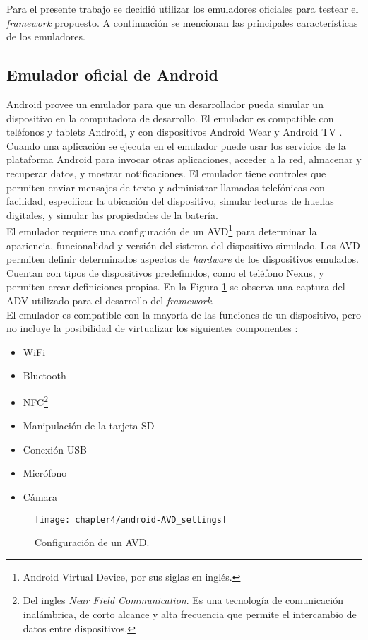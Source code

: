 Para el presente trabajo se decidió utilizar los emuladores oficiales para testear el \emph{framework} propuesto. A continuación se mencionan las principales características de los emuladores.
\subsection{Emulador oficial de Android}\label{ch05:andoid-emulator}
Android provee un emulador para que un desarrollador pueda simular un dispositivo en la computadora de desarrollo. El emulador es compatible con teléfonos y tablets Android, y con dispositivos Android Wear y Android TV \cite{daemu}.\\

Cuando una aplicación se ejecuta en el emulador puede usar los servicios de la plataforma Android para invocar otras aplicaciones, acceder a la red, almacenar y recuperar datos, y mostrar notificaciones. El emulador tiene controles que permiten enviar mensajes de texto y administrar llamadas telefónicas con facilidad, especificar la ubicación del dispositivo, simular lecturas de huellas digitales, y simular las propiedades de la batería.\\

El emulador requiere una configuración de un AVD\footnote{Android Virtual Device, por sus siglas en inglés.} para determinar la apariencia, funcionalidad y versión del sistema del dispositivo simulado. Los AVD permiten definir determinados aspectos de \emph{hardware} de los dispositivos emulados. Cuentan con tipos de dispositivos predefinidos, como el teléfono Nexus, y permiten crear definiciones propias. En la Figura \ref{fig:ch05:androidAVDsettings} se observa una captura del ADV utilizado para el desarrollo del \emph{framework}.\\

El emulador es compatible con la mayoría de las funciones de un dispositivo, pero no incluye la posibilidad de virtualizar los siguientes componentes \cite{daemu}:
\begin{multicols}{2}
  \begin{itemize}
    \item WiFi
    \item Bluetooth
    \item NFC\footnote{Del ingles \emph{Near Field Communication}. Es una tecnología de comunicación inalámbrica, de corto alcance y alta frecuencia que permite el intercambio de datos entre dispositivos.}
    \item Manipulación de la tarjeta SD
    \item Conexión USB
    \item Micrófono
    \item Cámara
  \end{itemize}
\end{multicols}
\begin{figure}[htbp]
    \centering
	\texttt{[image: chapter4/android-AVD\_settings]}
	\caption{Configuración de un AVD.}
    \label{fig:ch05:androidAVDsettings}
\end{figure}
